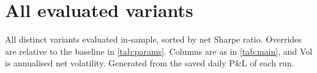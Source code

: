 \section{All evaluated variants}
\label{app:variants}

All \NVariants{} distinct variants evaluated in-sample, sorted by net Sharpe ratio. Overrides
are relative to the baseline in \cref{tab:params}. Columns are as in \cref{tab:main}, and Vol is
annualised net volatility. Generated from the saved daily P\&L of each run.

{\small

}
